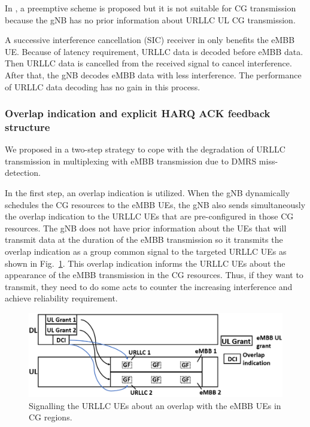 \documentclass{ieeeaccess}
\begin{document}
In \cite{ref18}, a preemptive scheme is proposed but it is not suitable for CG transmission because the gNB has no prior information about URLLC UL CG transmission.

A successive interference cancellation (SIC) receiver in \cite{ref19} only benefits the eMBB UE. Because of latency requirement, URLLC data is decoded before eMBB data. Then URLLC data is cancelled from the received signal to cancel interference. After that, the gNB decodes eMBB data with less interference. The performance of URLLC data decoding has no gain in this process.

\subsubsection{Overlap indication and explicit HARQ ACK feedback structure}\label{IIB2}

We proposed in \cite{ad99} a two-step strategy to cope with the degradation of URLLC transmission in multiplexing with eMBB transmission due to DMRS miss-detection.

In the first step, an overlap indication is utilized. When the gNB dynamically schedules the CG resources to the eMBB UEs, the gNB also sends simultaneously the overlap indication to the URLLC UEs that are pre-configured in those CG resources. The gNB does not have prior information about the UEs that will transmit data at the duration of the eMBB transmission so it transmits the overlap indication as a group common signal to the targeted URLLC UEs as shown in Fig.~\ref{fig2}. This overlap indication informs the URLLC UEs about the appearance of the eMBB transmission in the CG resources. Thus, if they want to transmit, they need to do some acts to counter the increasing interference and achieve reliability requirement.

\begin{figure}[htbp]
\centerline{\includegraphics[scale=0.28]{fig2.PNG}}
\caption{Signalling the URLLC UEs about an overlap with the eMBB UEs in CG regions.}
\label{fig2}
\vspace{-2mm}
\end{figure}
\end{document}
